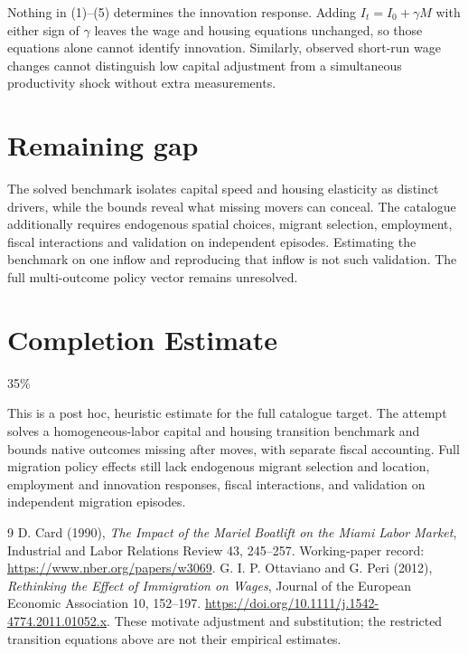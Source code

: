 \documentclass[11pt,a4paper]{article}
\begin{document}
Nothing in (1)--(5) determines the innovation response. Adding $I_t=I_0+\gamma M$ with either sign of $\gamma$ leaves the wage and housing equations unchanged, so those equations alone cannot identify innovation. Similarly, observed short-run wage changes cannot distinguish low capital adjustment from a simultaneous productivity shock without extra measurements.

\section{Remaining gap}
The solved benchmark isolates capital speed and housing elasticity as distinct drivers, while the bounds reveal what missing movers can conceal. The catalogue additionally requires endogenous spatial choices, migrant selection, employment, fiscal interactions and validation on independent episodes. Estimating the benchmark on one inflow and reproducing that inflow is not such validation. The full multi-outcome policy vector remains unresolved.

\section{Completion Estimate}
35\%

This is a post hoc, heuristic estimate for the full catalogue target.
The attempt solves a homogeneous-labor capital and housing transition benchmark and bounds native outcomes missing after moves, with separate fiscal accounting. Full migration policy effects still lack endogenous migrant selection and location, employment and innovation responses, fiscal interactions, and validation on independent migration episodes.

\begin{thebibliography}{9}
 D. Card (1990), \emph{The Impact of the Mariel Boatlift on the Miami Labor Market}, Industrial and Labor Relations Review 43, 245--257. Working-paper record: \url{https://www.nber.org/papers/w3069}.
 G. I. P. Ottaviano and G. Peri (2012), \emph{Rethinking the Effect of Immigration on Wages}, Journal of the European Economic Association 10, 152--197. \url{https://doi.org/10.1111/j.1542-4774.2011.01052.x}. These motivate adjustment and substitution; the restricted transition equations above are not their empirical estimates.
\end{thebibliography}
\end{document}
